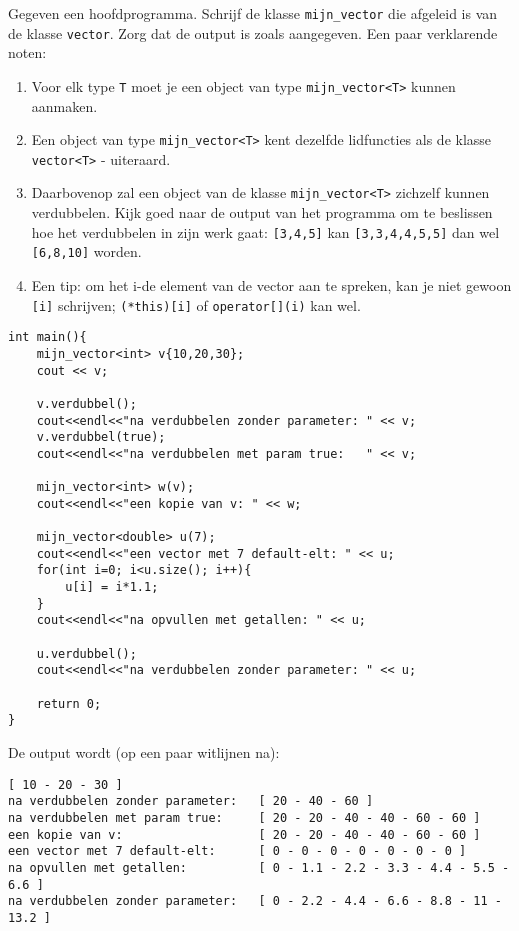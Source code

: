 \beginoef
Gegeven een hoofdprogramma. Schrijf de klasse \verb}mijn_vector} die afgeleid is van de klasse \verb}vector}. Zorg dat de output is zoals aangegeven.
Een paar verklarende noten:
\begin{enumerate}
\item Voor elk type \verb}T} moet je een object van type \verb}mijn_vector<T>} kunnen aanmaken.
\item Een object van type \verb}mijn_vector<T>} kent dezelfde lidfuncties als de klasse \verb}vector<T>} - uiteraard.
\item Daarbovenop zal een object van de klasse \verb}mijn_vector<T>} zichzelf kunnen verdubbelen. Kijk goed naar de output van het programma
om te beslissen hoe het verdubbelen in zijn werk gaat: \verb}[3,4,5]} kan \verb}[3,3,4,4,5,5]} dan wel \verb}[6,8,10]} worden.
\item Een tip: om het i-de element van de vector aan te spreken, kan je niet gewoon \verb}[i]} schrijven; \verb}(*this)[i]} of \verb}operator[](i)} kan wel.
\end{enumerate}
\begin{footnotesize}
\begin{verbatim}
int main(){	
    mijn_vector<int> v{10,20,30};  
    cout << v;

    v.verdubbel();              
    cout<<endl<<"na verdubbelen zonder parameter: " << v;	
    v.verdubbel(true);          
    cout<<endl<<"na verdubbelen met param true:   " << v;

    mijn_vector<int> w(v);      
    cout<<endl<<"een kopie van v: " << w;	

    mijn_vector<double> u(7);   
    cout<<endl<<"een vector met 7 default-elt: " << u;        
    for(int i=0; i<u.size(); i++){
        u[i] = i*1.1;
    }
    cout<<endl<<"na opvullen met getallen: " << u;

    u.verdubbel();              
    cout<<endl<<"na verdubbelen zonder parameter: " << u;            
   
    return 0;
}
\end{verbatim}
\end{footnotesize}

De output wordt (op een paar witlijnen na):
\begin{footnotesize}
\begin{verbatim}
[ 10 - 20 - 30 ]
na verdubbelen zonder parameter:   [ 20 - 40 - 60 ]
na verdubbelen met param true:     [ 20 - 20 - 40 - 40 - 60 - 60 ]
een kopie van v:                   [ 20 - 20 - 40 - 40 - 60 - 60 ]
een vector met 7 default-elt:      [ 0 - 0 - 0 - 0 - 0 - 0 - 0 ]
na opvullen met getallen:          [ 0 - 1.1 - 2.2 - 3.3 - 4.4 - 5.5 - 6.6 ]
na verdubbelen zonder parameter:   [ 0 - 2.2 - 4.4 - 6.6 - 8.8 - 11 - 13.2 ]
\end{verbatim}
\end{footnotesize}
\endoef
\vspace{-0.5cm}
